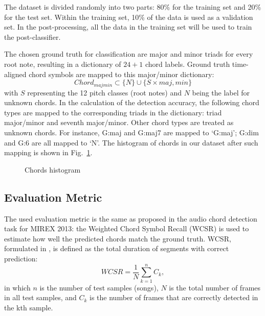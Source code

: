 \documentclass{article}
\begin{document}
The dataset is divided randomly into two parts: 80\% for the training set and 20\% for the test set. Within the training set, 10\% of the data is used as a validation set. In the post-processing, all the data in the training set will be used to train the post-classifier.

The chosen ground truth for classification are major and minor triads for every root note, resulting in a dictionary of $24+1$ chord labels.
Ground truth time-aligned chord symbols are mapped to this major/minor dictionary:
\begin{equation}
Chord_{majmin} \subset \{N\} \cup \{S \times {maj,min}\}
\end{equation}
with $S$ representing the 12 pitch classes (root notes) and $N$ being the label for unknown chords. In the calculation of the detection accuracy, the following chord types are mapped to the corresponding triads in the dictionary: triad major/minor and seventh major/minor. Other chord types are treated as unknown chords. For instance, G:maj and G:maj7 are mapped to `G:maj'; G:dim and G:6 are all mapped to `N'. The histogram of chords in our dataset after such mapping is shown in Fig.~\ref{fig:distrib}. 
\begin{figure}
 \centerline{}
 \caption{Chords histogram}
 \label{fig:distrib}
\end{figure}

\subsection{Evaluation Metric}
The used evaluation metric is the same as proposed in the audio chord detection task for MIREX 2013: the Weighted Chord Symbol Recall (WCSR) is used to estimate how well the predicted chords match the ground truth. WCSR, formulated in , is defined as the total duration of segments with correct prediction:   
\begin{equation}\label{csr}
WCSR = \frac{1}{N} \sum_{k=1}^n C_{k},
\end{equation}
in which $n$ is the number of test samples (songs), $N$ is the total number of frames in all test samples, and $C_{k}$ is the number of frames that are correctly detected in the kth sample. 
\end{document}
